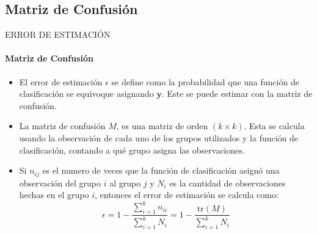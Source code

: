 \subsection{Matriz de Confusión}
\begin{frame}{ERROR DE ESTIMACIÓN}
    \framesubtitle{Matriz de Confusión}
    \begin{itemize}
        \item El error de estimación $\epsilon$ se define como la probabilidad que una función de clasificación se equivoque asignando $\mathbf{y}$. Este se puede estimar con la matriz de confusión.
        \item La matriz de confusión $M$, es una matriz de orden $(k \times k)$. Esta se calcula usando la observación de cada uno de los grupos utilizados y la función de clasificación, contando a qué grupo asigna las observaciones. 
        \item Si $n_{ij}$ es el numero de veces que la función de clasificación asignó una observación del grupo $i$ al grupo $j$ y $N_i$ es la cantidad de observaciones hechas en el grupo $i$, entonces el error de estimación se calcula como:
        \begin{equation}
            \epsilon = 1 - \dfrac{\sum_{i = 1}^{k} n_{ii}}{\sum_{i = 1}^k N_i} = 1 - \dfrac{\text{tr}(M)}{\sum_{i = 1}^k N_i} 
        \end{equation}
    \end{itemize}
\end{frame}